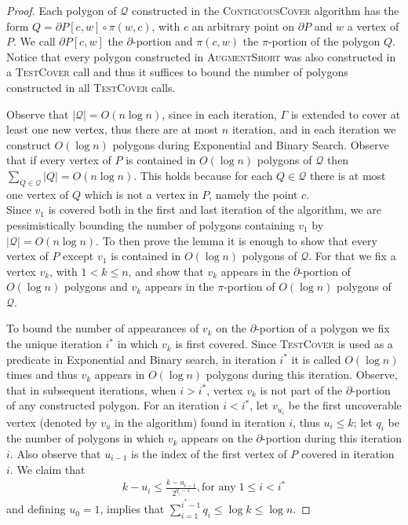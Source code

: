 \documentclass{llncs}
\begin{document}
\begin{proof}
Each polygon of $\mathcal{Q}$ constructed in the \textsc{ContiguousCover} algorithm has the form $Q = \partial P[c, w]  \circ \pi(w,c)$, with $c$ an arbitrary point on $\partial P$ and $w$ a vertex of $P$. We call $\partial P[c, w]$ the $\partial$-portion and $\pi(c, w)$ the $\pi$-portion of the polygon $Q$.  Notice that  every polygon constructed in \textsc{AugmentShort} was also constructed in a \textsc{TestCover} call and thus it suffices to bound the number of polygons constructed in all \textsc{TestCover} calls.

Observe that $|\mathcal{Q}| = O(n \log n)$, since in each iteration, $\Gamma$ is extended to cover at least one new vertex, thus there are at most $n$ iteration, and in each iteration we construct $O(\log n)$ polygons during Exponential and Binary Search.
Observe that if every vertex of $P$ is contained in $O(\log n)$ polygons of $\mathcal{Q}$ then $\sum_{Q \in \mathcal{Q}} |Q| = O(n \log n)$. This holds because for each $Q \in \mathcal{Q}$ there is at most one vertex of $Q$ which is not a vertex in $P$, namely the point $c$. \\ Since $v_1$ is covered both in the first and last iteration of the algorithm, we are pessimistically bounding the number of polygons containing $v_1$ by $|\mathcal{Q}| = O(n \log n)$. To then prove the lemma it is enough to show that every vertex of $P$ except $v_1$ is contained in $O(\log n)$ polygons of $\mathcal{Q}$. For that we fix a vertex $v_k$, with $1<k \leq n$, and show that $v_k$ appears in the $\partial$-portion of $O(\log n)$ polygons and $v_k$ appears in the $\pi$-portion of $O(\log n)$ polygons of $\mathcal{Q}$.  

To bound the number of appearances of $v_k$ on the $\partial$-portion of a polygon we fix the unique iteration $i^*$ in which  $v_k$ is first covered.  Since \textsc{TestCover} is used as a predicate in Exponential and Binary search, in iteration $i^*$ it is called $O(\log n)$ times and thus $v_k$ appears in $O(\log n)$ polygons during this iteration. Observe, that in subsequent iterations, when $i>i^*$, vertex $v_k$ is not part of the $\partial$-portion of any constructed polygon. For an iteration $i < i^*$, let $v_{u_i}$ be the first uncoverable vertex (denoted by $v_u$ in the algorithm) found in iteration $i$, thus  $u_i \leq k$; let $q_i$ be the number of polygons in which $v_k$ appears on the $\partial$-portion during this iteration $i$. Also observe that $u_{i-1}$ is the index of the first  vertex of $P$ covered in iteration $i$.
We claim that 
\begin{align}
k - u_i \leq \frac{k-u_{i-1}}{2^{q_i-1}},  \text{for any} \; 1\leq i < i^*
\label{loginterval}
\end{align}
and defining $u_0 = 1$, implies that $\sum^ {i^*-1}_{i = 1} q_i  \leq \log k \leq \log n$.


\end{proof}
\end{document}

